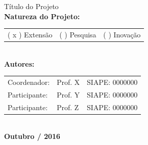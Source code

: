 \documentclass[12pt]{article}
\begin{document}
\begin{titlepage}
\center %
{\Huge
Título do Projeto
}
\\[3cm]
%
%
%
\justify
\Large
{\bf Natureza do Projeto:}

\center
\begin{tabular}{lcr}
( x ) Extensão & ( \quad ) Pesquisa & ( \quad ) Inovação
\end{tabular}
\\[2cm]
\justify
\Large \textbf{Autores:}


\begin{tabular}{lll}
Coordenador: & Prof. X  & SIAPE: 0000000\\
Participante: &  Prof. Y & SIAPE: 0000000\\
Participante: &  Prof. Z & SIAPE: 0000000
\end{tabular}

%
\qquad
%
\\[3cm]%
%
%
%
\center
{\bf\Large Outubro / 2016}\\[2cm]
\vfill
\end{titlepage}




{\large

%

}
\end{document}
